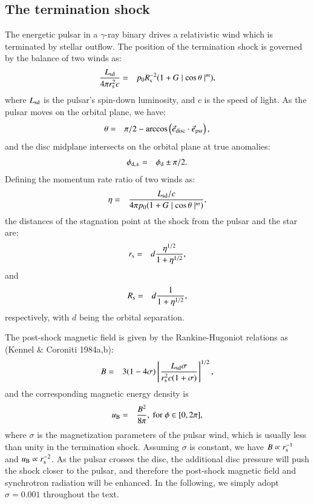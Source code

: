 \documentclass{aa}
\begin{document}
\subsection{The termination shock}
The energetic pulsar in a $\gamma$-ray binary drives a relativistic wind which is terminated by stellar outflow. The position of the termination shock is governed by the balance of two winds as:
\begin{eqnarray}\label{dyn}
  \frac{L_{\rm sd}}{4\pi r_{\rm s}^2c}&=&p_0R_{\rm s}^{-2} (1+G\mid\cos\theta\mid^m),
\end{eqnarray}
where $L_{\rm sd}$ is the pulsar's spin-down luminosity, and $c$ is the speed of light. As the pulsar moves on the orbital plane, we have:
\begin{eqnarray}\label{theta}
  \theta &=&\pi /2-\arccos \left( \vec{e}_{\rm{disc}}\cdot \vec{e}_{\rm{psr}} \right) ,
\end{eqnarray}
and the disc midplane intersects on the orbital plane at true anomalies:
\begin{eqnarray}\label{midplane}
  \phi_{\rm d, \pm}&=&\phi_{\rm d}\pm \pi/2.
\end{eqnarray}
Defining the momentum rate ratio of two winds as:
\begin{eqnarray}\label{eta}
  \eta&=&\frac{L_{\rm sd}/c}{4\pi p_0(1+G\mid\cos\theta\mid^m)},
\end{eqnarray}
the distances of the stagnation point at the shock from the pulsar and the star are:
\begin{eqnarray}\label{rs}
  r_{\rm s}&=&d \frac{\eta^{1/2}}{1+\eta^{1/2}},
\end{eqnarray}
and
\begin{eqnarray}\label{Rs}
  R_{\rm s}&=&d \frac{1}{1+\eta^{1/2}},
\end{eqnarray}
respectively, with $d$ being the orbital separation.

The post-shock magnetic field is given by the Rankine-Hugoniot relations as (Kennel \& Coroniti 1984a,b):
\begin{eqnarray}\label{B}
B&=&3(1-4\sigma)\left[\frac{L_{\rm sd}\sigma}{r_{\rm s}^2c(1+\sigma)}\right]^{1/2},
\end{eqnarray}
and the corresponding magnetic energy density is
\begin{eqnarray}\label{uB}
  u_{\rm B}&=&\frac{B^2}{8\pi},\ \rm{for}\ \phi\in[0,2\pi],
\end{eqnarray}
where $\sigma$ is the magnetization parameters of the pulsar wind, which is usually less than unity in the termination shock. Assuming $\sigma$ is constant, we have $B\propto r_{\rm s}^{-1}$ and $u_{\rm B}\propto r_{\rm s}^{-2}$. As the pulsar crosses the disc, the additional disc pressure will push the shock closer to the pulsar, and therefore the post-shock magnetic field and synchrotron radiation will be enhanced. In the following, we simply adopt $\sigma=0.001$ throughout the text.
\end{document}
